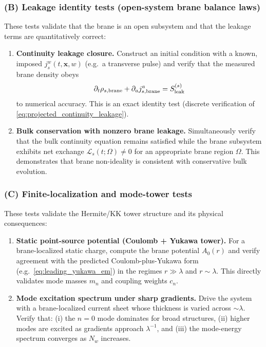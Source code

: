 \documentclass[11pt]{article}
\newcommand{\x}{\mathbf{x}}     %
\newcommand{\Sleak}{S_{\rm leak}}
\begin{document}
\subsubsection*{(B) Leakage identity tests (open-system brane balance laws)}
These tests validate that the brane is an open subsystem and that the leakage terms
are quantitatively correct:
\begin{enumerate}[leftmargin=1.6em]
\item \textbf{Continuity leakage closure.}
Construct an initial condition with a known, imposed \(j_s^w(t,\x,w)\) (e.g.\ a
transverse pulse) and verify that the measured brane density obeys
\begin{equation}
\partial_t \rho_{s,\rm brane} + \partial_a j_{s,\rm brane}^a = \Sleak^{(s)}
\end{equation}
to numerical accuracy. This is an exact identity test (discrete verification of
\eqref{eq:projected_continuity_leakage}).

\item \textbf{Bulk conservation with nonzero brane leakage.}
Simultaneously verify that the bulk continuity equation remains satisfied while the
brane subsystem exhibits net exchange \(\mathcal{L}_s(t;\Omega)\neq 0\) for an
appropriate brane region \(\Omega\). This demonstrates that brane non-ideality is
consistent with conservative bulk evolution.
\end{enumerate}

\subsubsection*{(C) Finite-localization and mode-tower tests}
These tests validate the Hermite/KK tower structure and its physical consequences:
\begin{enumerate}[leftmargin=1.6em]
\item \textbf{Static point-source potential (Coulomb + Yukawa tower).}
For a brane-localized static charge, compute the brane potential \(A_0(r)\) and
verify agreement with the predicted Coulomb-plus-Yukawa form
(e.g.\ \eqref{eq:leading_yukawa_em}) in the regimes \(r\gg\lambda\) and \(r\sim\lambda\).
This directly validates mode masses \(m_n\) and coupling weights \(c_n\).

\item \textbf{Mode excitation spectrum under sharp gradients.}
Drive the system with a brane-localized current sheet whose thickness is varied
across \(\sim\lambda\). Verify that:
(i) the \(n=0\) mode dominates for broad structures,
(ii) higher modes are excited as gradients approach \(\lambda^{-1}\),
and (iii) the mode-energy spectrum converges as \(N_w\) increases.
\end{enumerate}
\end{document}

